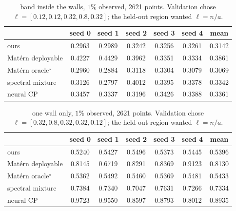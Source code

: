 \begin{table}[h]
  \centering
  \caption{band inside the walls, $1\%$ observed, 2621 points.  Validation chose $\ell = [0.12, 0.12, 0.32, 0.8, 0.32]$; the held-out region wanted $\ell = n/a$.}
  \small
  \begin{tabular}{lcccccc}
    \toprule
    & seed 0 & seed 1 & seed 2 & seed 3 & seed 4 & mean \\
    \midrule
    ours & 0.2963 & 0.2989 & 0.3242 & 0.3256 & 0.3261 & 0.3142 \\
    Mat\'ern deployable & 0.4227 & 0.4429 & 0.3962 & 0.3351 & 0.3334 & 0.3861 \\
    Mat\'ern oracle$^\star$ & 0.2960 & 0.2884 & 0.3118 & 0.3304 & 0.3079 & 0.3069 \\
    spectral mixture & 0.3126 & 0.2797 & 0.4012 & 0.3395 & 0.3378 & 0.3342 \\
    neural CP & 0.3457 & 0.3337 & 0.3196 & 0.3426 & 0.3388 & 0.3361 \\
    \bottomrule
  \end{tabular}
\end{table}

\begin{table}[h]
  \centering
  \caption{one wall only, $1\%$ observed, 2621 points.  Validation chose $\ell = [0.32, 0.8, 0.32, 0.32, 0.12]$; the held-out region wanted $\ell = n/a$.}
  \small
  \begin{tabular}{lcccccc}
    \toprule
    & seed 0 & seed 1 & seed 2 & seed 3 & seed 4 & mean \\
    \midrule
    ours & 0.5240 & 0.5427 & 0.5496 & 0.5373 & 0.5445 & 0.5396 \\
    Mat\'ern deployable & 0.8145 & 0.6719 & 0.8291 & 0.8369 & 0.9123 & 0.8130 \\
    Mat\'ern oracle$^\star$ & 0.5362 & 0.5492 & 0.5460 & 0.5369 & 0.5481 & 0.5433 \\
    spectral mixture & 0.7384 & 0.7340 & 0.7047 & 0.7631 & 0.7266 & 0.7334 \\
    neural CP & 0.9723 & 0.9550 & 0.8597 & 0.8793 & 0.8012 & 0.8935 \\
    \bottomrule
  \end{tabular}
\end{table}

